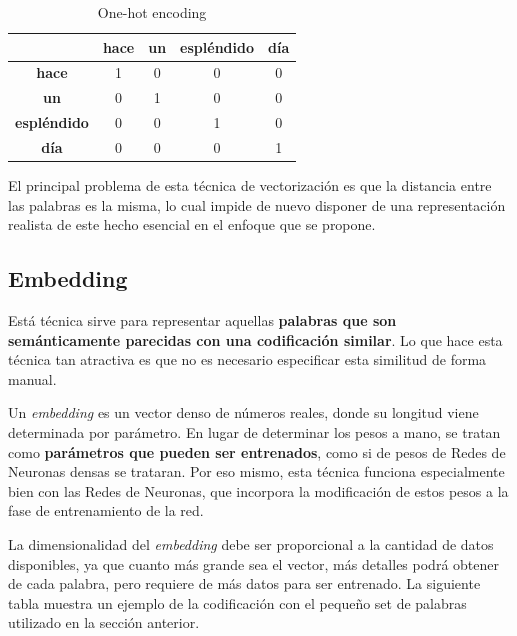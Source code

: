 \documentclass[12pt,a4paper, xcolor=table]{article}
\begin{document}
\newpage

  \begin{table}[!h]
        \centering
        \begin{tabular}{|c|c|c|c|c|}
        \hline
        \textbf{} &\textbf{hace} & \textbf{un} & \textbf{espléndido} & \textbf{día}  \\ \hline
        \textbf{hace}                     & 1 & 0 & 0 & 0\\ \hline
        \textbf{un}                       & 0 & 1 & 0 & 0\\ \hline
        \textbf{espléndido}               & 0 & 0 & 1 & 0\\ \hline
        \textbf{día}                      & 0 & 0 & 0 & 1\\ \hline
        \end{tabular}
        \caption{One-hot encoding}
            \label{fig:graf_exp1}
    \end{table}

\vspace{2mm}

El principal problema de esta técnica de vectorización es que la distancia entre las palabras es la misma, lo cual impide de nuevo disponer de una representación realista de este hecho esencial en el enfoque que se propone.

\subsection{Embedding}

Está técnica sirve para representar aquellas \textbf{palabras que son semánticamente parecidas con una codificación similar}. Lo que hace esta técnica tan atractiva es que no es necesario especificar esta similitud de forma manual.

\vspace{2mm}

Un \textit{embedding} es un vector denso de números reales, donde su longitud viene determinada por parámetro. En lugar de determinar los pesos a mano, se tratan como \textbf{parámetros que pueden ser entrenados}, como si de pesos de Redes de Neuronas densas se trataran. Por eso mismo, esta técnica funciona especialmente bien con las Redes de Neuronas, que incorpora la modificación de estos pesos a la fase de entrenamiento de la red.

\vspace{2mm}

La dimensionalidad del \textit{embedding} debe ser proporcional a la cantidad de datos disponibles, ya que cuanto más grande sea el vector, más detalles podrá obtener de cada palabra, pero requiere de más datos para ser entrenado. La siguiente tabla muestra un ejemplo de la codificación con el pequeño set de palabras utilizado en la sección anterior.
\end{document}
